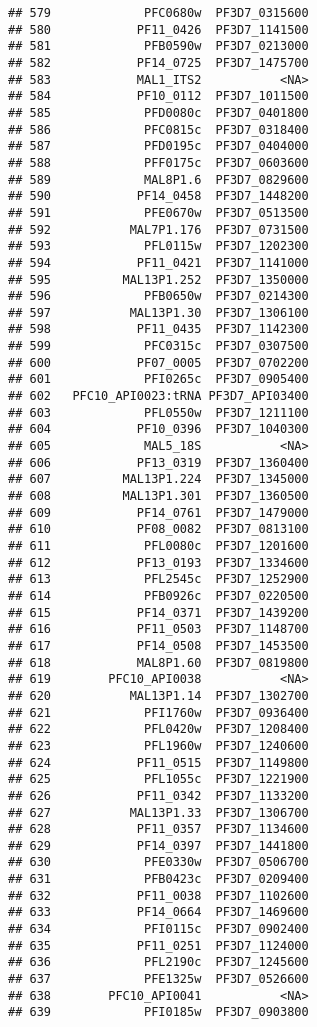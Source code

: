 \documentclass[12pt, a4paper]{article}\usepackage[]{graphicx}\usepackage[]{color}
\makeatletter
\newenvironment{kframe}{%
 \def\at@end@of@kframe{}%
 \ifinner\ifhmode%
  \def\at@end@of@kframe{\end{minipage}}%
  \begin{minipage}{\columnwidth}%
 \fi\fi%
 \def\FrameCommand##1{\hskip\@totalleftmargin \hskip-\fboxsep
 \colorbox{shadecolor}{##1}\hskip-\fboxsep
     \hskip-\linewidth \hskip-\@totalleftmargin \hskip\columnwidth}%
 \MakeFramed {\advance\hsize-\width
   \@totalleftmargin\z@ \linewidth\hsize
   \@setminipage}}%
 {\par\unskip\endMakeFramed%
 \at@end@of@kframe}
\newenvironment{knitrout}{}{} %
\makeatother
\begin{document}
\begin{knitrout}
\begin{kframe}
\begin{verbatim}
## 579             PFC0680w  PF3D7_0315600
## 580            PF11_0426  PF3D7_1141500
## 581             PFB0590w  PF3D7_0213000
## 582            PF14_0725  PF3D7_1475700
## 583            MAL1_ITS2           <NA>
## 584            PF10_0112  PF3D7_1011500
## 585             PFD0080c  PF3D7_0401800
## 586             PFC0815c  PF3D7_0318400
## 587             PFD0195c  PF3D7_0404000
## 588             PFF0175c  PF3D7_0603600
## 589             MAL8P1.6  PF3D7_0829600
## 590            PF14_0458  PF3D7_1448200
## 591             PFE0670w  PF3D7_0513500
## 592           MAL7P1.176  PF3D7_0731500
## 593             PFL0115w  PF3D7_1202300
## 594            PF11_0421  PF3D7_1141000
## 595          MAL13P1.252  PF3D7_1350000
## 596             PFB0650w  PF3D7_0214300
## 597           MAL13P1.30  PF3D7_1306100
## 598            PF11_0435  PF3D7_1142300
## 599             PFC0315c  PF3D7_0307500
## 600            PF07_0005  PF3D7_0702200
## 601             PFI0265c  PF3D7_0905400
## 602   PFC10_API0023:tRNA PF3D7_API03400
## 603             PFL0550w  PF3D7_1211100
## 604            PF10_0396  PF3D7_1040300
## 605             MAL5_18S           <NA>
## 606            PF13_0319  PF3D7_1360400
## 607          MAL13P1.224  PF3D7_1345000
## 608          MAL13P1.301  PF3D7_1360500
## 609            PF14_0761  PF3D7_1479000
## 610            PF08_0082  PF3D7_0813100
## 611             PFL0080c  PF3D7_1201600
## 612            PF13_0193  PF3D7_1334600
## 613             PFL2545c  PF3D7_1252900
## 614             PFB0926c  PF3D7_0220500
## 615            PF14_0371  PF3D7_1439200
## 616            PF11_0503  PF3D7_1148700
## 617            PF14_0508  PF3D7_1453500
## 618            MAL8P1.60  PF3D7_0819800
## 619        PFC10_API0038           <NA>
## 620           MAL13P1.14  PF3D7_1302700
## 621             PFI1760w  PF3D7_0936400
## 622             PFL0420w  PF3D7_1208400
## 623             PFL1960w  PF3D7_1240600
## 624            PF11_0515  PF3D7_1149800
## 625             PFL1055c  PF3D7_1221900
## 626            PF11_0342  PF3D7_1133200
## 627           MAL13P1.33  PF3D7_1306700
## 628            PF11_0357  PF3D7_1134600
## 629            PF14_0397  PF3D7_1441800
## 630             PFE0330w  PF3D7_0506700
## 631             PFB0423c  PF3D7_0209400
## 632            PF11_0038  PF3D7_1102600
## 633            PF14_0664  PF3D7_1469600
## 634             PFI0115c  PF3D7_0902400
## 635            PF11_0251  PF3D7_1124000
## 636             PFL2190c  PF3D7_1245600
## 637             PFE1325w  PF3D7_0526600
## 638        PFC10_API0041           <NA>
## 639             PFI0185w  PF3D7_0903800

\end{verbatim}
\end{kframe}
\end{knitrout}
\end{document}
